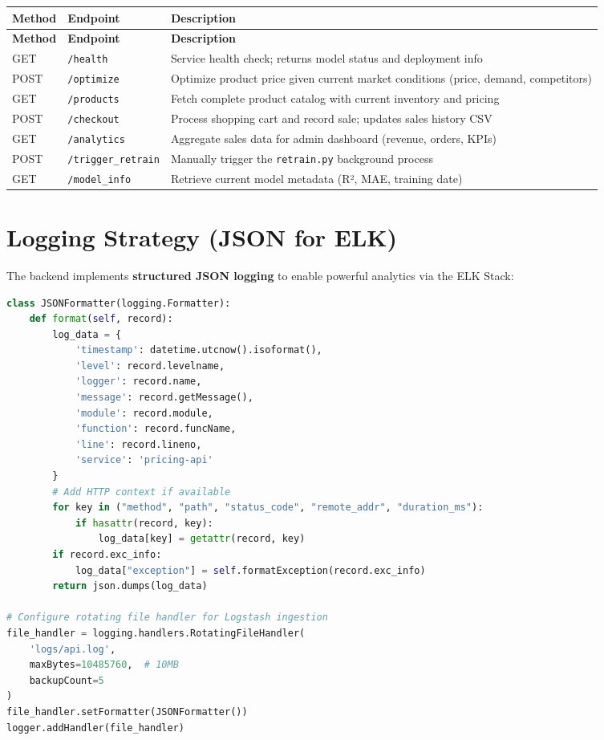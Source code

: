 \documentclass[12pt,a4paper]{report}
\begin{document}
\begin{longtable}{L{2cm} L{2.5cm} L{5.8cm}}
    \toprule
    \textbf{Method} & \textbf{Endpoint} & \textbf{Description} \\
    \midrule
    \endfirsthead
    \toprule
    \textbf{Method} & \textbf{Endpoint} & \textbf{Description} \\
    \midrule
    \endhead
    \bottomrule
    \endfoot
    GET & \texttt{/health} & Service health check; returns model status and deployment info \\[4pt]
    POST & \texttt{/optimize} & Optimize product price given current market conditions (price, demand, competitors) \\[4pt]
    GET & \texttt{/products} & Fetch complete product catalog with current inventory and pricing \\[4pt]
    POST & \texttt{/checkout} & Process shopping cart and record sale; updates sales history CSV \\[4pt]
    GET & \texttt{/analytics} & Aggregate sales data for admin dashboard (revenue, orders, KPIs) \\[4pt]
    POST & \texttt{/trigger\_retrain} & Manually trigger the \texttt{retrain.py} background process \\[4pt]
    GET & \texttt{/model\_info} & Retrieve current model metadata (R², MAE, training date) \\[4pt]
\end{longtable}

\section{Logging Strategy (JSON for ELK)}

The backend implements \textbf{structured JSON logging} to enable powerful analytics via the ELK Stack:

\begin{lstlisting}[language=Python, caption={JSON Logging Configuration in app.py}]
class JSONFormatter(logging.Formatter):
    def format(self, record):
        log_data = {
            'timestamp': datetime.utcnow().isoformat(),
            'level': record.levelname,
            'logger': record.name,
            'message': record.getMessage(),
            'module': record.module,
            'function': record.funcName,
            'line': record.lineno,
            'service': 'pricing-api'
        }
        # Add HTTP context if available
        for key in ("method", "path", "status_code", "remote_addr", "duration_ms"):
            if hasattr(record, key):
                log_data[key] = getattr(record, key)
        if record.exc_info:
            log_data["exception"] = self.formatException(record.exc_info)
        return json.dumps(log_data)

# Configure rotating file handler for Logstash ingestion
file_handler = logging.handlers.RotatingFileHandler(
    'logs/api.log',
    maxBytes=10485760,  # 10MB
    backupCount=5
)
file_handler.setFormatter(JSONFormatter())
logger.addHandler(file_handler)
\end{lstlisting}
\end{document}
